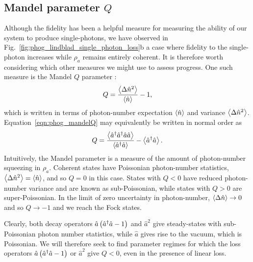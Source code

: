 \subsection{Mandel parameter $Q$}
Although the fidelity has been a helpful measure for measuring the ability of our system to produce single-photons, we have observed in Fig.~\ref{fig:phog_lindblad_single_photon_loss}b a case where fidelity to the single-photon increases while $\rho_a$ remains entirely coherent. It is therefore worth considering which other measures we might use to assess progress. One such measure is the Mandel $Q$ parameter \cite{Mandel1979, Carmichael1999, Davidovich1996}:
\begin{equation}\label{eqn:phog_mandelQ}
Q = \frac{\ev{\Delta\hat{n}^2}}{\ev{\hat{n}}} - 1,
\end{equation}
which is written in terms of photon-number expectation $\ev{\hat{n}}$ and variance $\ev{\Delta\hat{n}^2}$. Equation~\ref{eqn:phog_mandelQ} may equivalently be written in normal order as 
\begin{equation}
Q = \frac{\ev{\hat{a}^\dagger \hat{a}^\dagger \hat{a}\hat{a}}}{\ev{\hat{a}^\dagger \hat{a}}} - \ev{\hat{a}^\dagger \hat{a}}.
\end{equation}
Intuitively, the Mandel parameter is a measure of the amount of photon-number squeezing in $\rho_a$. Coherent states have Poissonian photon-number statistics, $\ev{\Delta\hat{n}^2} = \ev{\hat{n}}$, and so $Q = 0$ in this case. States with $Q < 0$ have reduced photon-number variance and are known as sub-Poissonian, while states with $Q > 0$ are super-Poissonian. In the limit of zero uncertainty in photon-number, $\ev{\Delta\hat{n}} \rightarrow 0$ and so $Q \rightarrow -1$ and we reach the Fock states.

Clearly, both decay operators $\hat{a}\left(\hat{a}^\dagger \hat{a} - 1\right)$ and $\hat{a}^2$ give steady-states with sub-Poissonian photon number statistics, while $\hat{a}$ gives rise to the vacuum, which is Poissonian. We will therefore seek to find parameter regimes for which the loss operators $\hat{a}\left(\hat{a}^\dagger \hat{a} - 1\right)$ or $\hat{a}^2$ give $Q<0$, even in the presence of linear loss.


